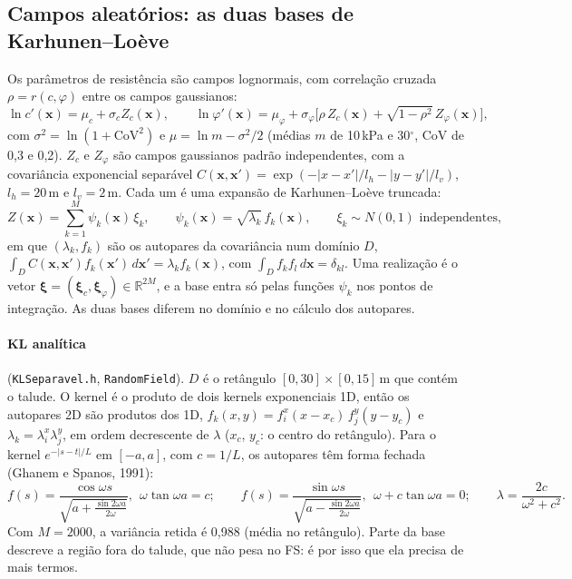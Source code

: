 \documentclass[11pt,a4paper]{article}
\begin{document}
\subsection{Campos aleatórios: as duas bases de Karhunen--Loève}\label{sec:kl}
Os parâmetros de resistência são campos lognormais, com correlação cruzada $\rho = r(c, \varphi)$ entre os campos
gaussianos:
\begin{equation}
  \ln c'(\bm x) = \mu_c + \sigma_c Z_c(\bm x), \qquad
  \ln\varphi'(\bm x) = \mu_\varphi + \sigma_\varphi\big[\rho\, Z_c(\bm x) + \sqrt{1-\rho^2}\, Z_\varphi(\bm x)\big],
\end{equation}
com $\sigma^2 = \ln(1 + \mathrm{CoV}^2)$ e $\mu = \ln m - \sigma^2/2$ (médias $m$ de 10\,kPa e 30$^\circ$, CoV de 0,3 e
0,2). $Z_c$ e $Z_\varphi$ são campos gaussianos padrão independentes, com a covariância exponencial separável
$C(\bm x, \bm x') = \exp(-|x - x'|/l_h - |y - y'|/l_v)$, $l_h = 20$\,m e $l_v = 2$\,m. Cada um é uma expansão de
Karhunen--Loève truncada:
\begin{equation}
  Z(\bm x) = \sum_{k=1}^{M} \psi_k(\bm x)\,\xi_k, \qquad \psi_k(\bm x) = \sqrt{\lambda_k}\, f_k(\bm x), \qquad
  \xi_k \sim N(0, 1) \text{ independentes},
  \label{eq:kl}
\end{equation}
em que $(\lambda_k, f_k)$ são os autopares da covariância num domínio $D$,
$\int_D C(\bm x, \bm x') f_k(\bm x')\,d\bm x' = \lambda_k f_k(\bm x)$, com $\int_D f_k f_l\,d\bm x = \delta_{kl}$. Uma
realização é o vetor $\bm\xi = (\bm\xi_c, \bm\xi_\varphi) \in \mathbb R^{2M}$, e a base entra só pelas funções $\psi_k$
nos pontos de integração. As duas bases diferem no domínio e no cálculo dos autopares.

\paragraph{KL analítica} (\texttt{KLSeparavel.h}, \texttt{RandomField}). $D$ é o retângulo $[0, 30]\times[0, 15]$\,m
que contém o talude. O kernel é o produto de dois kernels exponenciais 1D, então os autopares 2D são produtos dos 1D,
$f_k(x, y) = f^x_i(x - x_c)\, f^y_j(y - y_c)$ e $\lambda_k = \lambda^x_i \lambda^y_j$, em ordem decrescente de
$\lambda$ ($x_c$, $y_c$: o centro do retângulo). Para o kernel $e^{-|s - t|/L}$ em $[-a, a]$, com $c = 1/L$, os
autopares têm forma fechada (Ghanem e Spanos, 1991):
\begin{equation*}
  f(s) = \frac{\cos\omega s}{\sqrt{a + \frac{\sin 2\omega a}{2\omega}}}, \ \ \omega\tan\omega a = c; \qquad
  f(s) = \frac{\sin\omega s}{\sqrt{a - \frac{\sin 2\omega a}{2\omega}}}, \ \ \omega + c\tan\omega a = 0; \qquad
  \lambda = \frac{2c}{\omega^2 + c^2}.
\end{equation*}
Com $M = 2000$, a variância retida é 0,988 (média no retângulo). Parte da base descreve a região fora do talude, que não
pesa no FS: é por isso que ela precisa de mais termos.
\end{document}
